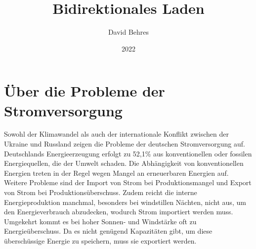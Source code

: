 \documentclass[11pt]{article}
\title{Bidirektionales Laden}
\author{David Behres}
\date{2022}
\begin{document}
    \section{Über die Probleme der Stromversorgung}

    Sowohl der Klimawandel als auch der internationale Konflikt zwischen der Ukraine und Russland
    zeigen die Probleme der deutschen Stromversorgung auf.
    Deutschlands Energieerzeugung erfolgt zu 52,1\% aus konventionellen oder fossilen Energiequellen, die der Umwelt
    schaden.
    Die Abhängigkeit von konventionellen Energien treten in der Regel wegen Mangel an erneuerbaren Energien auf.
    Weitere Probleme sind der Import von Strom bei Produktionsmangel und Export von Strom bei Produktionsüberschuss.
    Zudem reicht die interne Energieproduktion manchmal, besonders bei windstillen Nächten, nicht aus, um den
    Energieverbrauch abzudecken, wodurch Strom importiert werden muss.
    Umgekehrt kommt es bei hoher Sonnen- und Windstärke oft zu Energieüberschuss.
    Da es nicht genügend Kapazitäten gibt, um diese überschüssige Energie zu speichern, muss sie exportiert werden.




    
    
\end{document}
